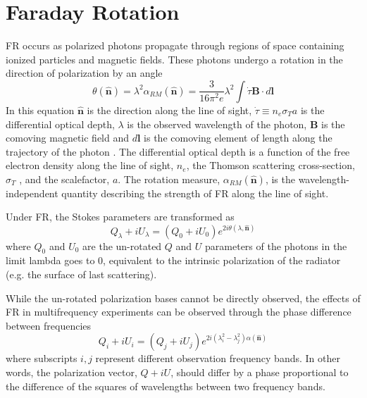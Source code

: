 \documentclass[usenatbib,hidelinks]{mnras}
\newcommand{\nhat}{\hat{\mathbf{n}}}
\begin{document}
\section{Faraday Rotation}\label{sec:faraday rotation}{

 FR occurs as polarized photons propagate through regions of space  containing ionized particles and magnetic fields. These photons undergo a rotation in the direction of polarization by an angle 
\begin{equation}
\theta(\nhat)=\lambda^{2} \alpha_{RM}(\nhat)=\frac{3}{16\pi^{2}e}\lambda^{2} \int \dot{\tau}\mathbf{B}\cdot d\mathbf{l}  \label{eqn:fr}
\end{equation}
In this equation $\nhat$ is the direction along the line of sight, $\dot{\tau}\equiv n_{e}\sigma_{T}a$ is the differential optical depth,  $\lambda$ is the observed wavelength of the photon, $\mathbf{B}$ is the comoving magnetic  field 
and $d\mathbf{l}$ is the comoving element of length along the trajectory of the photon \citep{De:2013}. The differential optical depth is a function of the free electron density along the line of sight, $n_{e}$, the Thomson scattering cross-section, $\sigma_{T}$ , and the scalefactor, $a$.
	The rotation measure, $\alpha_{RM}(\nhat)$, is the wavelength-independent quantity describing the strength of FR along the line of sight. 
	 
Under FR, the Stokes parameters are transformed as
\begin{equation}
Q_{\lambda} + i U_{\lambda} = (Q_{0} + iU_{0})e^{2i\theta(\lambda,\nhat)}  \label{stokes_transform}
\end{equation}
where $Q_{0}$ and $U_{0}$ are the un-rotated $Q$ and $U$ parameters of the photons in the limit lambda goes to 0, 
equivalent to the intrinsic polarization of the radiator 
(e.g. the surface of last scattering).

While the un-rotated polarization bases cannot be directly observed, the effects of FR in multifrequency experiments can be observed through the phase difference between frequencies
\begin{equation}
Q_{i} + i U_{i} = (Q_{j} + iU_{j})e^{2i(\lambda_{i}^{2}-\lambda_{j}^{2})\alpha(\nhat)} \label{eqn:stokes_multi-freq}
\end{equation}
where subscripts $i,j$ represent different observation frequency bands. In other words, the polarization vector, $Q +iU$, should differ by a phase proportional to the difference of the squares of wavelengths between two frequency bands.


}
\end{document}
